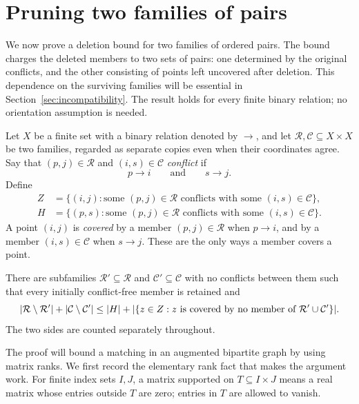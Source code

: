 \section{Pruning two families of pairs}\label{sec:pruning}

We now prove a deletion bound for two families of ordered pairs.  The bound
charges the deleted members to two sets of pairs: one determined by the
original conflicts, and the other consisting of points left uncovered after
deletion.  This dependence on the surviving families will be essential in
Section~\ref{sec:incompatibility}.  The result holds for every finite binary
relation; no orientation assumption is needed.

\begin{lemma}[Pruning]\label{lem:pruning}
Let $X$ be a finite set with a binary relation denoted by $\to$, and let
$\mathcal R,\mathcal C\subseteq X\times X$ be two families, regarded as
separate copies even when their coordinates agree.  Say that
$(p,j)\in\mathcal R$ and $(i,s)\in\mathcal C$ \emph{conflict} if
\[
 p\to i\qquad\text{and}\qquad s\to j.
\]
Define
\begin{align*}
 Z&=\{(i,j):\text{some }(p,j)\in\mathcal R
       \text{ conflicts with some }(i,s)\in\mathcal C\},\\
 H&=\{(p,s):\text{some }(p,j)\in\mathcal R
       \text{ conflicts with some }(i,s)\in\mathcal C\}.
\end{align*}
A point $(i,j)$ is \emph{covered} by a member $(p,j)\in\mathcal R$ when
$p\to i$, and by a member $(i,s)\in\mathcal C$ when $s\to j$.
These are the only ways a member covers a point.

There are subfamilies $\mathcal R'\subseteq\mathcal R$ and
$\mathcal C'\subseteq\mathcal C$ with no conflicts between them such that
every initially conflict-free member is retained and
\begin{equation}\label{eq:pruning-bound}
 \lvert \mathcal R\setminus\mathcal R'\rvert+
 \lvert \mathcal C\setminus\mathcal C'\rvert
 \leq \lvert H\rvert+
 \lvert \{z\in Z:z\text{ is covered by no member of }
                    \mathcal R'\cup\mathcal C'\}\rvert.
\end{equation}
The two sides are counted separately throughout.
\end{lemma}

The proof will bound a matching in an augmented bipartite graph by using
matrix ranks.  We first record the elementary rank fact that makes the
argument work.  For finite index sets $I,J$, a matrix supported on
$T\subseteq I\times J$ means a real matrix whose entries outside $T$ are
zero; entries in $T$ are allowed to vanish.

